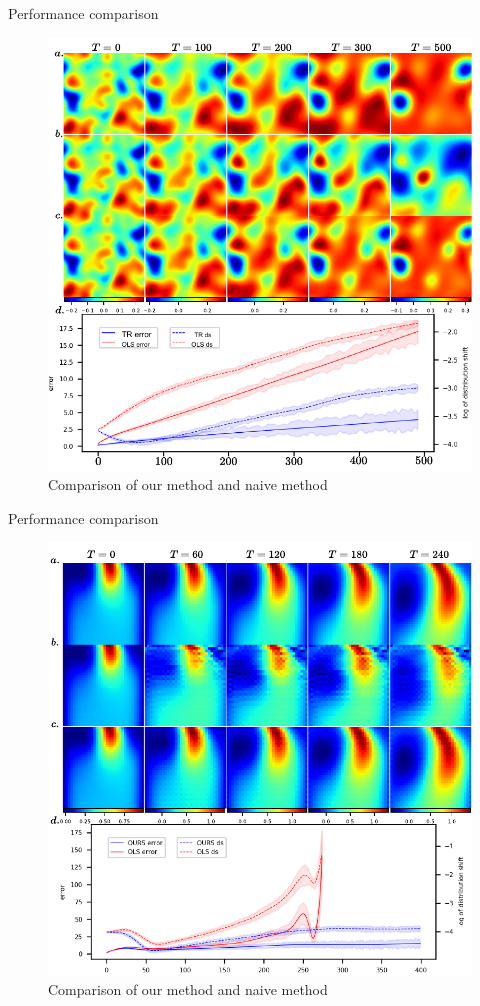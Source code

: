 \documentclass[NUS-Kajima workshop]{beamer}
\begin{document}
\begin{frame}{Performance comparison}
	\begin{figure}[H]
          \centering
          \centerline{\includegraphics[width=.7\linewidth]{fig/RD-TR.pdf}}
          \caption{Comparison of our method and naive method}
\end{figure}
\end{frame}

\begin{frame}{Performance comparison}
	\begin{figure}[H]
          \centering
          \centerline{\includegraphics[width=.7\linewidth]{fig/NS-TR.pdf}}
          \caption{Comparison of our method and naive method}
\end{figure}
\end{frame}
\end{document}

